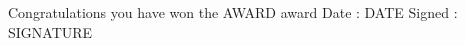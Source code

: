 \documentclass{article}
\begin{document}
Congratulations you have won the AWARD award\linebreak
Date : DATE\linebreak
Signed : SIGNATURE
\end{document}
